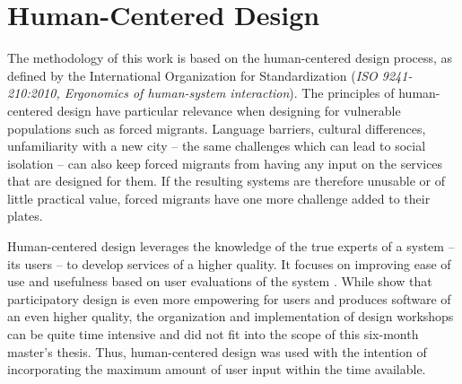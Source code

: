 \section{Human-Centered Design}
\label{sec:hcd}

The methodology of this work is based on the human-centered design process, as defined by the International Organization for Standardization  (\textit{ISO 9241-210:2010, Ergonomics of human-system interaction}). The principles of human-centered design have particular relevance when designing for vulnerable populations such as forced migrants. Language barriers, cultural differences, unfamiliarity with a new city – the same challenges which can lead to social isolation – can also keep forced migrants from having any input on the services that are designed for them. If the resulting systems are therefore unusable or of little practical value, forced migrants have one more challenge added to their plates.

Human-centered design leverages the knowledge of the true experts of a system – its users – to develop services of a higher quality. It focuses on improving ease of use and usefulness based on user evaluations of the system \cite{roth_user-centered_2015}. While  show that participatory design is even more empowering for users and produces software of an even higher quality, the organization and implementation of design workshops can be quite time intensive and did not fit into the scope of this six-month master's thesis. Thus, human-centered design was used with the intention of incorporating the maximum amount of user input within the time available.